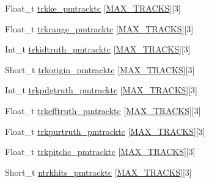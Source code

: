 \begin{DoxyCompactItemize}
\item 
Float\-\_\-t \hyperlink{classanatree_af0afdb9e534b9cf7d849ae2649367e5a}{trkke\-\_\-pmtracktc} \mbox{[}\hyperlink{anatree__core__v09410002_8h_a327fd4e796e4a0d78947524c96e4362e}{M\-A\-X\-\_\-\-T\-R\-A\-C\-K\-S}\mbox{]}\mbox{[}3\mbox{]}
\item 
Float\-\_\-t \hyperlink{classanatree_af42f7a01fa5915855e38ba562699f4b3}{trkrange\-\_\-pmtracktc} \mbox{[}\hyperlink{anatree__core__v09410002_8h_a327fd4e796e4a0d78947524c96e4362e}{M\-A\-X\-\_\-\-T\-R\-A\-C\-K\-S}\mbox{]}\mbox{[}3\mbox{]}
\item 
Int\-\_\-t \hyperlink{classanatree_a909a4bd609aeb07b38c5349d249d6c3d}{trkidtruth\-\_\-pmtracktc} \mbox{[}\hyperlink{anatree__core__v09410002_8h_a327fd4e796e4a0d78947524c96e4362e}{M\-A\-X\-\_\-\-T\-R\-A\-C\-K\-S}\mbox{]}\mbox{[}3\mbox{]}
\item 
Short\-\_\-t \hyperlink{classanatree_a700d7d60e968a6971cd4e071b432a89e}{trkorigin\-\_\-pmtracktc} \mbox{[}\hyperlink{anatree__core__v09410002_8h_a327fd4e796e4a0d78947524c96e4362e}{M\-A\-X\-\_\-\-T\-R\-A\-C\-K\-S}\mbox{]}\mbox{[}3\mbox{]}
\item 
Int\-\_\-t \hyperlink{classanatree_a48631f8f358d5da86116bb593b7882e5}{trkpdgtruth\-\_\-pmtracktc} \mbox{[}\hyperlink{anatree__core__v09410002_8h_a327fd4e796e4a0d78947524c96e4362e}{M\-A\-X\-\_\-\-T\-R\-A\-C\-K\-S}\mbox{]}\mbox{[}3\mbox{]}
\item 
Float\-\_\-t \hyperlink{classanatree_a04e336aa3d32304ac0036dfab7dbd11e}{trkefftruth\-\_\-pmtracktc} \mbox{[}\hyperlink{anatree__core__v09410002_8h_a327fd4e796e4a0d78947524c96e4362e}{M\-A\-X\-\_\-\-T\-R\-A\-C\-K\-S}\mbox{]}\mbox{[}3\mbox{]}
\item 
Float\-\_\-t \hyperlink{classanatree_a489a3d21d6372888890032f2e566fed4}{trkpurtruth\-\_\-pmtracktc} \mbox{[}\hyperlink{anatree__core__v09410002_8h_a327fd4e796e4a0d78947524c96e4362e}{M\-A\-X\-\_\-\-T\-R\-A\-C\-K\-S}\mbox{]}\mbox{[}3\mbox{]}
\item 
Float\-\_\-t \hyperlink{classanatree_a883bde0d3ffe160c1ca7811804956109}{trkpitchc\-\_\-pmtracktc} \mbox{[}\hyperlink{anatree__core__v09410002_8h_a327fd4e796e4a0d78947524c96e4362e}{M\-A\-X\-\_\-\-T\-R\-A\-C\-K\-S}\mbox{]}\mbox{[}3\mbox{]}
\item 
Short\-\_\-t \hyperlink{classanatree_a2c1291bed14180d4df5d6292b7b1e9b7}{ntrkhits\-\_\-pmtracktc} \mbox{[}\hyperlink{anatree__core__v09410002_8h_a327fd4e796e4a0d78947524c96e4362e}{M\-A\-X\-\_\-\-T\-R\-A\-C\-K\-S}\mbox{]}\mbox{[}3\mbox{]}
\item 

\end{DoxyCompactItemize}
